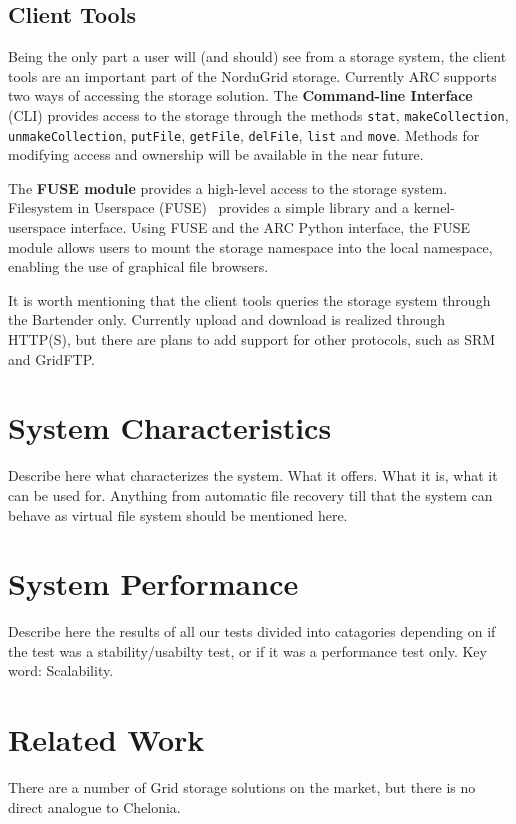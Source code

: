 \documentclass[preprint,12pt]{elsarticle}
\begin{document}
\subsection{Client Tools}
\label{sec:clienttools}
Being the only part a user will (and should) see from a storage
system, the client tools are an important part of the NorduGrid
storage. Currently ARC supports two ways of accessing the storage
solution. The \textbf{Command-line Interface} (CLI) provides access to
the storage through the methods \texttt{stat},
\texttt{makeCollection}, \texttt{unmakeCollection}, \texttt{putFile},
\texttt{getFile}, \texttt{delFile}, \texttt{list} and
\texttt{move}. Methods for modifying access and ownership will be
available in the near future.

The \textbf{FUSE module} provides a high-level access to the storage
system. Filesystem in Userspace (FUSE)~\cite{FUSE} provides a simple
library and a kernel-userspace interface. Using FUSE and the ARC
Python interface, the FUSE module allows users to mount the storage
namespace into the local namespace, enabling the use of graphical file
browsers.

It is worth mentioning that the client tools queries the storage
system through the Bartender only. Currently upload and download is
realized through HTTP(S), but there are plans to add support for other
protocols, such as SRM and GridFTP.

\section{System Characteristics}
\label{sec:systemcharateristics}
Describe here what characterizes the system. What it offers. What it
is, what it can be used for. Anything from automatic file recovery
till that the system can behave as virtual file system should be mentioned
here.

\section{System Performance}
\label{sec:systemperformance}
Describe here the results of all our tests divided into catagories
depending on if the test was a stability/usabilty test, or if it was a
performance test only. Key word: Scalability.

\section{Related Work}
\label{sec:systemperformance}
There are a number of Grid storage solutions on the market, but there
is no direct analogue to Chelonia. 
\end{document}
